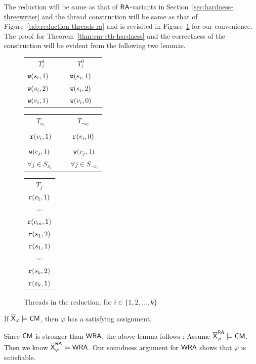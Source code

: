 The reduction will be same as that of $\mathsf{RA}$-variants in Section~\ref{sec:hardness-threewriter} and the thread construction will be same as that of Figure~\ref{tab:reduction-threads-ra} and is revisited in Figure~\ref{tab:reduction-threads-cm} for our convenience.
The proof for Theorem~\ref{thm:cm-eth-hardness} and the correctness of the construction will be evident from the following two lemmas. 
\begin{figure}
\footnotesize%

\begin{tabular}{c| c}
    $T_i^1$ & $T_i^0$  \\
    $\mathtt{w}(s_i, 1)$~~&~~$\mathtt{w}(s_i, 1)$~~ \\
    $\mathtt{w}(s_i, 2)$~~&~~$\mathtt{w}(s_i, 2)$~~ \\
    $\mathtt{w}(v_i, 1)$~~&~~$\mathtt{w}(v_i, 0)$~~
\end{tabular}
\hfill
\begin{tabular}{c | c }
    $T_{x_i}$~ & ~$T_{\neg x_i}$ \\
        & \\
        $\mathtt{r}(v_i, 1)$~&~$\mathtt{r}(v_i, 0)$ \\
        & \\
        $\mathtt{w}(c_j, 1)$ ~&~ $\mathtt{w}(c_j, 1)$ \\
        $\forall j \in S_{x_i}$ ~&~  $\forall j \in S_{\neg x_i}$ 
\end{tabular}
\hfill
\begin{tabular}{c}
    $T_f$ \\
    $\mathtt{r}(c_1, 1)$ \\
    $\cdots$ \\
    $\mathtt{r}(c_m, 1)$ \\
    $\mathtt{r}(s_1, 2)$ \\
    $\mathtt{r}(s_1, 1)$ \\
    $\cdots$ \\
    $\mathtt{r}(s_k, 2)$ \\
    $\mathtt{r}(s_k, 1)$ 
\end{tabular}
 \caption{Threads in the reduction, for $i \in \{1, 2, \dots, k\}$ }
   \label{tab:reduction-threads-cm}
\end{figure}

\begin{lemma}\label{lem:cm-eth}
If  $\overline{\mathsf{\color{black}X}}_\varphi \models \mathsf{CM}$, then $\varphi$ has a satisfying assignment. 
\end{lemma}

Since $\mathsf{CM}$ is stronger than $\mathsf{WRA}$, the above lemma follows : Assume $\overline{\mathsf{\color{black}X}}_\varphi^{\mathsf{RA}} \models \mathsf{CM}$. Then 
 we know $\overline{\mathsf{\color{black}X}}_\varphi^{\mathsf{RA}} \models \mathsf{WRA}$. Our soundness argument for $\mathsf{WRA}$ shows that $\varphi$ is satisfiable. 
 
